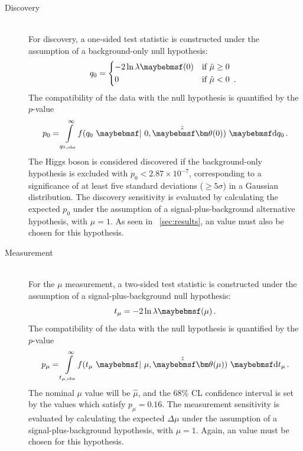 \begin{description}
\item[Discovery] \hfill \\
	For discovery, a one-sided test statistic is constructed under the assumption of a 
	background-only null hypothesis:
	\begin{equation}
		q_0 = 
		\begin{dcases*}
			-2 \ln \lambda\parenths{0} & if $\hat{\mu} \geq 0$ \\
			0 & if $\hat{\mu} < 0$ \,.
		\end{dcases*}
	\end{equation}
	The compatibility of the data with the null hypothesis is quantified by the $p$-value
	\begin{equation}
		p_{0} = \int\limits_{q_{0,\text{obs}}}^{\infty} \! f(q_{0}~\given~0, \hat{\hat{\bvec{\theta}}}(0)) \,\, \d{q_{0}} \,.
	\end{equation}
	The Higgs boson is considered discovered if the background-only hypothesis is excluded 
	with $p_0 < 2.87 \times 10^{-7}$, corresponding to a significance of at least five 
	standard deviations (\ie $\geq\!5\sigma$) in a Gaussian distribution. The discovery 
	sensitivity is evaluated by calculating the expected $p_0$ under the assumption of a 
	signal-plus-background alternative hypothesis, with $\mu = 1$. As seen in 
	\Section~\ref{sec:results}, an \mH value must also be chosen for this hypothesis.

\item[Measurement] \hfill \\
	For the $\mu$ measurement, a two-sided test statistic is constructed under the 
	assumption of a signal-plus-background null hypothesis:
	\begin{equation}
		t_{\mu} = -2 \ln \lambda\parenths{\mu} \,.
	\end{equation}
	The compatibility of the data with the null hypothesis is quantified by the $p$-value
	\begin{equation}
		p_{\mu} = \int\limits_{t_{\mu,\text{obs}}}^{\infty} \! f(t_{\mu}~\given~\mu, \hat{\hat{\bvec{\theta}}}(\mu)) \,\, \d{t_{\mu}} \,.
	\end{equation}
	The nominal $\mu$ value will be $\hat{\mu}$, and the 68\% CL confidence interval is 
	set by the values which	satisfy $p_{\mu} = 0.16$. The measurement sensitivity is 
	evaluated by calculating the expected $\Delta\mu$ under the assumption of a 
	signal-plus-background hypothesis, with $\mu = 1$. Again, an \mH value must be chosen 
	for this hypothesis.

\end{description}


